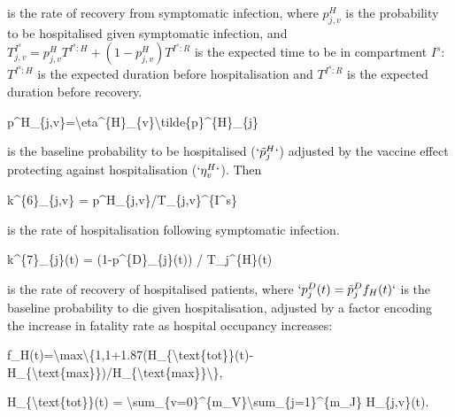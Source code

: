 \documentclass[
]{article}
\newenvironment{Shaded}{\begin{snugshade}}{\end{snugshade}}
\newcommand{\NormalTok}[1]{#1}
\begin{document}
is the rate of recovery from symptomatic infection, where \(p^H_{j,v}\) is the probability to be hospitalised given symptomatic infection, and \(T_{j,v}^{I^s} = p^H_{j,v}T^{I^s:H} + (1-p^H_{j,v})T^{I^s:R}\) is the expected time to be in compartment \(I^s\): \(T^{I^s:H}\) is the expected duration before hospitalisation and \(T^{I^s:R}\) is the expected duration before recovery.

\begin{Shaded}
\begin{Highlighting}[]
\NormalTok{p\^{}H\_\{j,v\}=\textbackslash{}eta\^{}\{H\}\_\{v\}\textbackslash{}tilde\{p\}\^{}\{H\}\_\{j\}}
\end{Highlighting}
\end{Shaded}

is the baseline probability to be hospitalised (\(`\tilde{p}^{H}_{j}`\)) adjusted by the vaccine effect protecting against hospitalisation (\(`\eta^{H}_{v}`\)). Then

\begin{Shaded}
\begin{Highlighting}[]
\NormalTok{k\^{}\{6\}\_\{j,v\} = p\^{}H\_\{j,v\}/T\_\{j,v\}\^{}\{I\^{}s\}}
\end{Highlighting}
\end{Shaded}

is the rate of hospitalisation following symptomatic infection.

\begin{Shaded}
\begin{Highlighting}[]
\NormalTok{k\^{}\{7\}\_\{j\}(t) = (1{-}p\^{}\{D\}\_\{j\}(t)) / T\_j\^{}\{H\}(t)}
\end{Highlighting}
\end{Shaded}

is the rate of recovery of hospitalised patients, where \(`p^{D}_{j}(t)=\tilde{p}^{D}_{j}f_H(t)`\) is the baseline probability to die given hospitalisation, adjusted by a factor encoding the increase in fatality rate as hospital occupancy increases:

\begin{Shaded}
\begin{Highlighting}[]
\NormalTok{f\_H(t)=\textbackslash{}max\textbackslash{}\{1,1+1.87(H\_\{\textbackslash{}text\{tot\}\}(t){-}H\_\{\textbackslash{}text\{max\}\})/H\_\{\textbackslash{}text\{max\}\}\textbackslash{}\},}
\end{Highlighting}
\end{Shaded}

\begin{Shaded}
\begin{Highlighting}[]
\NormalTok{H\_\{\textbackslash{}text\{tot\}\}(t) = \textbackslash{}sum\_\{v=0\}\^{}\{m\_V\}\textbackslash{}sum\_\{j=1\}\^{}\{m\_J\} H\_\{j,v\}(t).}
\end{Highlighting}
\end{Shaded}
\end{document}
